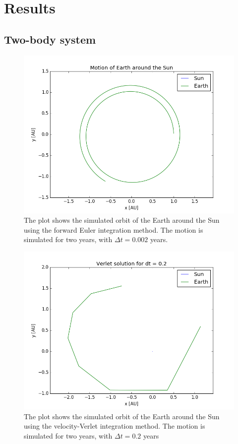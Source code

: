\section{Results}
\subsection{Two-body system}
\begin{figure}[h]
\includegraphics[scale=0.7]{figures/earth_sun_euler}
\caption{The plot shows the simulated orbit of the Earth around the Sun using the forward Euler integration method. The motion is simulated for two years, with $\Delta t = 0.002$ years.}
\end{figure}


\begin{figure}[h]
\includegraphics[scale=0.7]{figures/verlet_02}
\caption{The plot shows the simulated orbit of the Earth around the Sun using the velocity-Verlet integration method. The motion is simulated for two years, with $\Delta t = 0.2$ years}
\end{figure}

